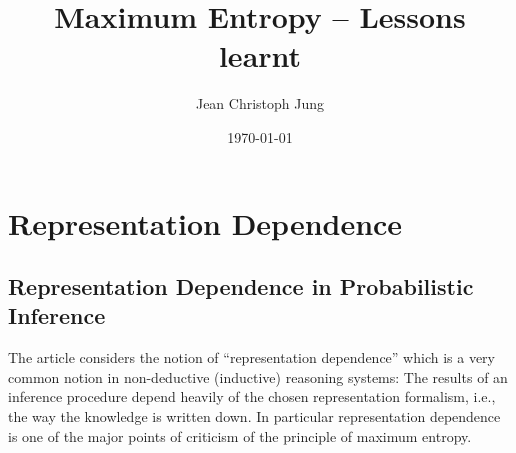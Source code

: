 \documentclass[a4wide]{article}
\title{Maximum Entropy -- Lessons learnt}
\date{\today}
\author{Jean Christoph Jung}
\begin{document}
\maketitle

\section{Representation Dependence}

\subsection{Representation Dependence in Probabilistic Inference \cite{HalpernK04}}

The article \cite{HalpernK04} considers the notion of ``representation dependence'' which
is a very common notion in non-deductive (inductive) reasoning systems: The results of an
inference procedure depend heavily of the chosen representation formalism, \mbox{i.e.}, the
way the knowledge is written down. In particular representation dependence is one of the
major points of criticism of the principle of maximum entropy. 




\end{document}
